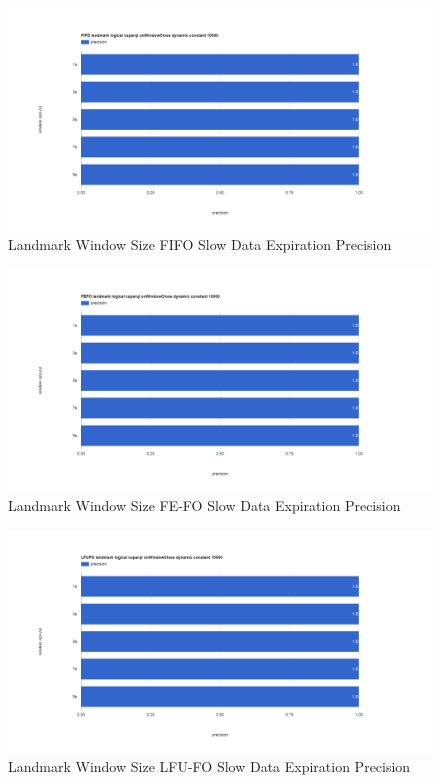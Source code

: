 \begin{figure}[!htbp]
    \centering
    \includegraphics[width=\textwidth]{img/app3-land-ws-fifo-slow-p.png}
    \caption{Landmark Window Size FIFO Slow Data Expiration Precision}
\end{figure}
\begin{figure}[!htbp]
    \centering
    \includegraphics[width=\textwidth]{img/app3-land-ws-fefo-slow-p.png}
    \caption{Landmark Window Size FE-FO Slow Data Expiration Precision}
\end{figure}
\begin{figure}[!htbp]
    \centering
    \includegraphics[width=\textwidth]{img/app3-land-ws-lfufo-slow-p.png}
    \caption{Landmark Window Size LFU-FO Slow Data Expiration Precision}
\end{figure}
